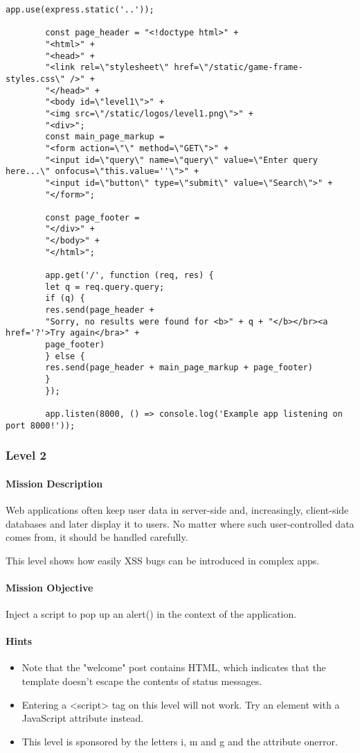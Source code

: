 \begin{Exercise}[label={websec-xss-game}]
\begin{lstlisting}[style=JavaScript]
		app.use(express.static('..'));
		
		const page_header = "<!doctype html>" +
		"<html>" +
		"<head>" +
		"<link rel=\"stylesheet\" href=\"/static/game-frame-styles.css\" />" +
		"</head>" +
		"<body id=\"level1\">" +
		"<img src=\"/static/logos/level1.png\">" +
		"<div>";
		const main_page_markup =
		"<form action=\"\" method=\"GET\">" +
		"<input id=\"query\" name=\"query\" value=\"Enter query here...\" onfocus=\"this.value=''\">" +
		"<input id=\"button\" type=\"submit\" value=\"Search\">" +
		"</form>";
		
		const page_footer =
		"</div>" +
		"</body>" +
		"</html>";
		
		app.get('/', function (req, res) {
		let q = req.query.query;
		if (q) {
		res.send(page_header +
		"Sorry, no results were found for <b>" + q + "</b></br><a href='?'>Try again</bra>" +
		page_footer)
		} else {
		res.send(page_header + main_page_markup + page_footer)
		}
		});
		
		app.listen(8000, () => console.log('Example app listening on port 8000!'));
		\end{lstlisting}

	\subsubsection{Level 2}
		\paragraph{Mission Description}
		Web applications often keep user data in server-side and, increasingly, client-side databases and later display it to users. No matter where such user-controlled data comes from, it should be handled carefully. 
		
		This level shows how easily XSS bugs can be introduced in complex apps.
		\paragraph{Mission Objective}
		Inject a script to pop up an alert() in the context of the application. 
		
		\paragraph{Hints}
		\begin{itemize}
			\item Note that the "welcome" post contains HTML, which indicates that the template doesn't escape the contents of status messages.
			\item Entering a <script> tag on this level will not work. Try an element with a JavaScript attribute instead.
			\item This level is sponsored by the letters i, m and g and the attribute onerror.
		\end{itemize}


\end{Exercise}
